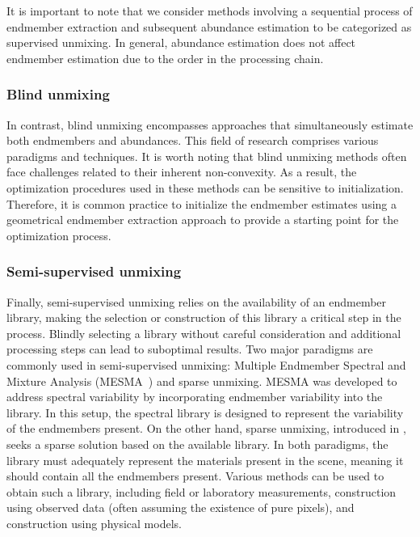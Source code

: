 It is important to note that we consider methods involving a sequential process of endmember extraction and subsequent abundance estimation to be categorized as supervised unmixing.
In general, abundance estimation does not affect endmember estimation due to the order in the processing chain.


\subsubsection{Blind unmixing}

In contrast, blind unmixing encompasses approaches that simultaneously estimate both endmembers and abundances.
This field of research comprises various paradigms and techniques.
It is worth noting that blind unmixing methods often face challenges related to their inherent non-convexity.
As a result, the optimization procedures used in these methods can be sensitive to initialization.
Therefore, it is common practice to initialize the endmember estimates using a geometrical endmember extraction approach to provide a starting point for the optimization process.

\subsubsection{Semi-supervised unmixing}

Finally, semi-supervised unmixing relies on the availability of an endmember library, making the selection or construction of this library a critical step in the process.
Blindly selecting a library without careful consideration and additional processing steps can lead to suboptimal results.
Two major paradigms are commonly used in semi-supervised unmixing: Multiple Endmember Spectral and Mixture Analysis (MESMA~\cite{roberts_mapping_1998}) and sparse unmixing.
MESMA was developed to address spectral variability by incorporating endmember variability into the library.
In this setup, the spectral library is designed to represent the variability of the endmembers present.
On the other hand, sparse unmixing, introduced in \cite{bioucas-dias_alternating_2010}, seeks a sparse solution based on the available library.
In both paradigms, the library must adequately represent the materials present in the scene, meaning it should contain all the endmembers present.
Various methods can be used to obtain such a library, including field or laboratory measurements, construction using observed data (often assuming the existence of pure pixels), and construction using physical models.

